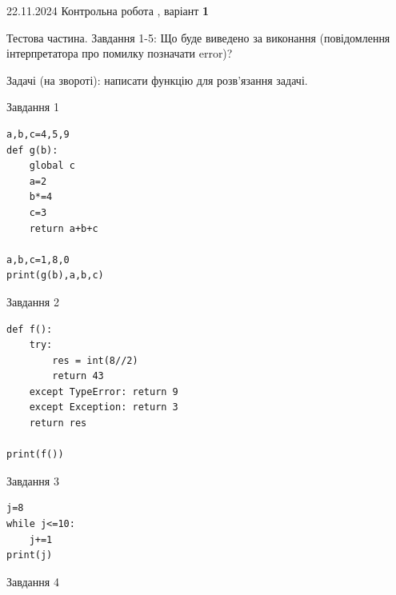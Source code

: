 \documentclass[12pt, ukrainian]{article}
\begin{document}
{{22.11.2024 Контрольна робота , варіант  \No \textbf { 1 }\par}}
{

Тестова частина. Завдання 1-5: Що буде виведено за виконання (повідомлення інтерпретатора про помилку позначати error)?

Задачі (на звороті): написати функцію для розв'язання задачі.

\vspace{5mm} \begin{minipage}[t]{8.5cm}
               
{\begin{center}Завдання {1}\end{center}}
\vspace{-6mm}

\begin{verbatim}
a,b,c=4,5,9
def g(b):
    global c
    a=2
    b*=4
    c=3
    return a+b+c

a,b,c=1,8,0
print(g(b),a,b,c)
\end{verbatim}


\vspace{5mm}
               
{\begin{center}Завдання {2}\end{center}}
\vspace{-6mm}

\begin{verbatim}
def f():
    try:
        res = int(8//2)
        return 43
    except TypeError: return 9
    except Exception: return 3
    return res

print(f())
\end{verbatim}


\vspace{5mm}
               
{\begin{center}Завдання {3}\end{center}}
\vspace{-6mm}

\begin{verbatim}
j=8
while j<=10:
    j+=1
print(j)
\end{verbatim}


\end{minipage}
\vline \hspace{6mm}
\begin{minipage}[t]{10.7cm}
               
{\begin{center}Завдання {4}\end{center}}
\vspace{-6mm}


\end{minipage}}
\end{document}
